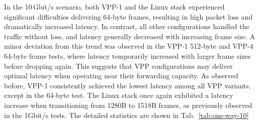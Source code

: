 In the 10\,Gbit/s scenario, both VPP-1 and the Linux stack experienced significant difficulties delivering 64-byte frames, resulting in high packet loss and dramatically increased latency.
In contrast, all other configurations handled the traffic without loss, and latency generally decreased with increasing frame size.
A minor deviation from this trend was observed in the VPP-1 512-byte and VPP-4 64-byte frame tests, where latency temporarily increased with larger frame sizes before dropping again.
This suggests that VPP configurations may deliver optimal latency when operating near their forwarding capacity.
As observed before, VPP-1 consistently achieved the lowest latency among all VPP variants, except in the 64-byte test.
The Linux stack once again exhibited a latency increase when transitioning from 1280B to 1518B frames, as previously observed in the 1Gbit/s tests.
The detailed statistics are shown in Tab.~\ref{tab:one-way-10}


